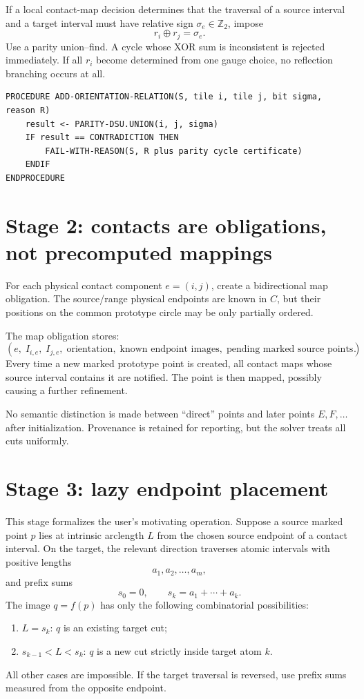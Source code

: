 \documentclass[11pt]{article}
\begin{document}
If a local contact-map decision determines that the traversal of a source interval and a target interval must have relative sign $\sigma_e\in\mathbb Z_2$, impose
\[
  r_i\oplus r_j=\sigma_e.
\]
Use a parity union--find.  A cycle whose XOR sum is inconsistent is rejected immediately.  If all $r_i$ become determined from one gauge choice, no reflection branching occurs at all.

\begin{lstlisting}[caption={Orientation propagation.}]
PROCEDURE ADD-ORIENTATION-RELATION(S, tile i, tile j, bit sigma, reason R)
    result <- PARITY-DSU.UNION(i, j, sigma)
    IF result == CONTRADICTION THEN
        FAIL-WITH-REASON(S, R plus parity cycle certificate)
    ENDIF
ENDPROCEDURE
\end{lstlisting}

\section{Stage 2: contacts are obligations, not precomputed mappings}

For each physical contact component $e=(i,j)$, create a bidirectional map obligation.  The source/range physical endpoints are known in $C$, but their positions on the common prototype circle may be only partially ordered.

The map obligation stores:
\[
  (e,\;I_{i,e},\;I_{j,e},\;\text{orientation},\;\text{known endpoint images},\;\text{pending marked source points}).
\]
Every time a new marked prototype point is created, all contact maps whose source interval contains it are notified.  The point is then mapped, possibly causing a further refinement.

No semantic distinction is made between ``direct'' points and later points $E,F,\ldots$ after initialization.  Provenance is retained for reporting, but the solver treats all cuts uniformly.

\section{Stage 3: lazy endpoint placement}
\label{sec:endpoint-placement}

This stage formalizes the user's motivating operation.  Suppose a source marked point $p$ lies at intrinsic arclength $L$ from the chosen source endpoint of a contact interval.  On the target, the relevant direction traverses atomic intervals with positive lengths
\[
  a_1,a_2,\ldots,a_m,
\]
and prefix sums
\[
  s_0=0,\qquad s_k=a_1+\cdots+a_k.
\]
The image $q=f(p)$ has only the following combinatorial possibilities:
\begin{enumerate}
  \item $L=s_k$: $q$ is an existing target cut;
  \item $s_{k-1}<L<s_k$: $q$ is a new cut strictly inside target atom $k$.
\end{enumerate}
All other cases are impossible.  If the target traversal is reversed, use prefix sums measured from the opposite endpoint.
\end{document}
